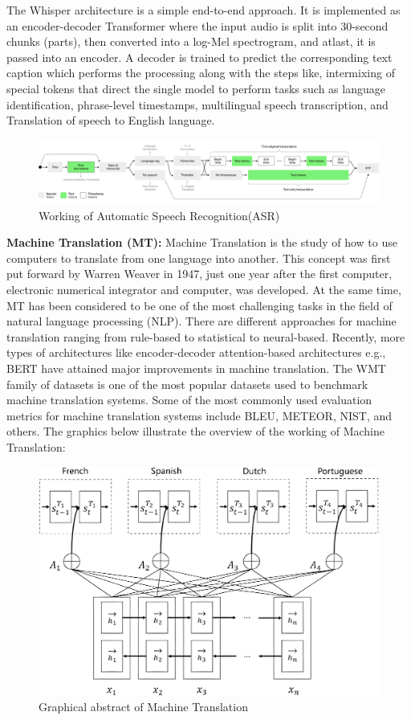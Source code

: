 \documentclass[12px, a4paper]{article}
\begin{document}
The Whisper architecture is a simple end-to-end approach. It is implemented as an encoder-decoder Transformer where the input audio is split into 30-second chunks (parts), then converted into a log-Mel spectrogram, and atlast, it is passed into an encoder. A decoder is trained to predict the corresponding text caption which performs the processing along with the steps like, intermixing of special tokens that direct the single model to perform tasks such as language identification, phrase-level timestamps, multilingual speech transcription, and Translation of speech to English language.

\begin{figure}[!htb]
    \includegraphics[width=\textwidth]{asr-details.png}
    \caption{Working of Automatic Speech Recognition(ASR)}
\end{figure}

\textbf{Machine Translation (MT):}
Machine Translation is the study of how to use computers to translate from one language into another. This concept was first put forward by Warren Weaver in 1947, just one year after the first computer, electronic numerical integrator and computer, was developed. At the same time, MT has been considered to be one of the most challenging tasks in the field of natural language processing (NLP). There are different approaches for machine translation ranging from rule-based to statistical to neural-based. Recently, more types of architectures like encoder-decoder attention-based architectures e.g., BERT have attained major improvements in machine translation. The WMT family of datasets is one of the most popular datasets used to benchmark machine translation systems. Some of the most commonly used evaluation metrics for machine translation systems include BLEU, METEOR, NIST, and others. The graphics below illustrate the overview of the working of Machine Translation: 

\begin{figure}[!htb]
    \centering
    \includegraphics[width=\textwidth]{MT.png}
    \caption{Graphical abstract of Machine Translation}
\end{figure}
\end{document}
